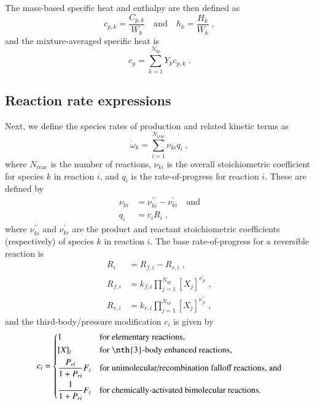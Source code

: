\documentclass[preprint,12pt]{elsarticle}
\newcommand{ \numsp }{N_{\text{sp}}}
\begin{document}
The mass-based specific heat and enthalpy are then defined as
\begin{equation}
c_{p,k} = \frac{C_{p,k}}{W_k} \quad \text{and} \quad h_k = \frac{H_k}{W_k} \;,
\end{equation}
and the mixture-averaged specific heat is
\begin{equation}
c_p = \sum_{k=1}^{\numsp} Y_k c_{p,k} \;.
\end{equation}

\subsection{Reaction rate expressions}

Next, we define the species rates of production and related kinetic terms as
\begin{equation}
\dot{\omega}_k = \sum_{i=1}^{N_{\text{reac}}} \nu_{k i} q_i \;,
\end{equation}
where $N_{\text{reac}}$ is the number of reactions, $\nu_{k i}$ is the overall stoichiometric coefficient for species $k$ in reaction $i$, and $q_i$ is the rate-of-progress for reaction $i$.
These are defined by
\begin{align}
\nu_{k i} &= \nu_{k i}^{\prime \prime} - \nu_{k i}^{\prime}  \quad \text{and} \\
q_i &= c_i R_i \;,
\end{align}
where $\nu_{k i}^{\prime \prime}$ and $\nu_{k i}^{\prime}$ are the product and reactant stoichiometric coefficients (respectively) of species $k$ in reaction $i$.
The base rate-of-progress for a reversible reaction is
\begin{align}
R_i &= R_{f, i} - R_{r, i} \;, \\
R_{f, i} &= k_{f, i} \prod_{j = 1}^{\numsp} [X_j]^{\nu_{j i}^{\prime}} \;, \\
R_{r, i} &= k_{r, i} \prod_{j = 1}^{\numsp} [X_j]^{\nu_{j i}^{\prime \prime}} \;,
\end{align}
and the third-body\slash pressure modification $c_i$ is given by
\begin{equation}
c_i = \begin{dcases}
  1 &\text{for elementary reactions,} \\
  [X]_i &\text{for \nth{3}-body enhanced reactions,} \\
  \frac{P_{r i}}{1 + P_{r i}} F_i &\text{for unimolecular/recombination falloff reactions, and} \\
  \frac{1}{1 + P_{r i}} F_i &\text{for chemically-activated bimolecular reactions.}
  \end{dcases}
\label{e:rxn_pressure}
\end{equation}
\end{document}
